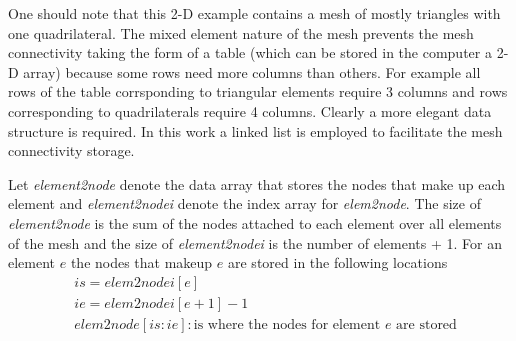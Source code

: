 \documentclass[letterpaper]{article}
\begin{document}
One should note that this 2-D example contains a mesh of mostly triangles with one quadrilateral.  The mixed element nature of the mesh prevents the mesh connectivity taking the form of a table (which can be stored in the computer a 2-D array) because some rows need more columns than others.  For example all rows of the table corrsponding to triangular elements require 3 columns and rows corresponding to quadrilaterals require 4 columns.  Clearly a more elegant data structure is required.  In this work a linked list is employed to facilitate the mesh connectivity storage.  
  
  Let \textit{element2node} denote the data array that stores the nodes that make up each element and \textit{element2nodei} denote the index array for \textit{elem2node}.  The size of \textit{element2node} is the sum of the nodes attached to each element over all elements of the mesh and the size of \textit{element2nodei} is the number of elements + 1.  For an element $e$ the nodes that makeup $e$ are stored in the following locations 
\begin{equation}
\begin{split}
 &  is = elem2nodei[e] \\
 &  ie = elem2nodei[e+1]-1 \\
 &  elem2node[is:ie]:\text{is where the nodes for element $e$ are stored}
\end{split}
\end{equation}
\end{document}
